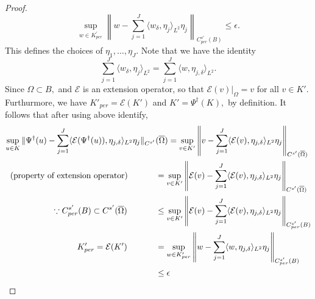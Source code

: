 \documentclass[reqno]{amsart}
\theoremstyle{plain}
\theoremstyle{definition}
\newcommand{\cal}[1]{\mathcal{#1}}
\begin{document}
\begin{proof}
    $$ \sup\limits_{w \in K^{'}_{per}} \left\|w - \sum_{j=1}^J \langle w_\delta,\eta_j\rangle_{L^2}\eta_j\right\|_{C^{s'}_{per}(B)} \leq \epsilon. $$ This defines the choices of $\eta_1, \dots, \eta_J$. Note that we have the identity
    $$ \sum\limits_{j=1}^{J}\langle w_\delta,\eta_j\rangle_{L^2} = \sum\limits_{j=1}^{J}\langle w,\eta_{j,\delta}\rangle_{L^2}.$$
    Since $\Omega \subset B,$ and $\cal E$ is an extension operator, so that $\cal E(v)|_{\Omega} = v$ for all $v \in K'$. Furthurmore, we have $K'_{per} = \cal E(K')$ and $K' = \Psi^\dag(K),$ by definition. It follows that after using above identify,
    $$
    \begin{aligned}
    \sup\limits_{u \in K} \|\Psi^\dag(u) - \sum_{j=1}^{J} \langle \cal E (\Psi^\dag(u)),\eta_{j,\delta} \rangle_{L^2} \eta_j \|_{C^{s'}}&(\overline{\Omega}) = \sup\limits_{v \in K'} \left\|v - \sum_{j=1}^{J} \langle \cal E (v),\eta_{j,\delta} \rangle_{L^2} \eta_j \right\|_{C^{s'}(\overline{\Omega})} \\
    \text{ (property of extension operator) } \hspace{3em}&= \sup\limits_{v \in K'} \left\|\cal E(v) - \sum_{j=1}^{J} \langle \cal E (v),\eta_{j,\delta} \rangle_{L^2} \eta_j \right\|_{C^{s'}(\overline{\Omega})} \\
    \because C^{s'}_{per}(B) \subset C^{s'}(\overline{\Omega}) \hspace{3.4em} &\leq \sup\limits_{v \in K'} \left\|\cal E(v) - \sum_{j=1}^{J} \langle \cal E (v),\eta_{j,\delta} \rangle_{L^2} \eta_j \right\|_{C^{s'}_{per}(B)} \\
    K'_{per} = \cal E (K') \hspace{3.4em}&= \sup\limits_{w \in K'_{per}} \left\|w - \sum_{j=1}^{J} \langle w,\eta_{j,\delta} \rangle_{L^2} \eta_j \right\|_{C^{s'}_{per}(B)} \\ &\leq \epsilon
    \end{aligned}
    $$

\end{proof}
\end{document}
